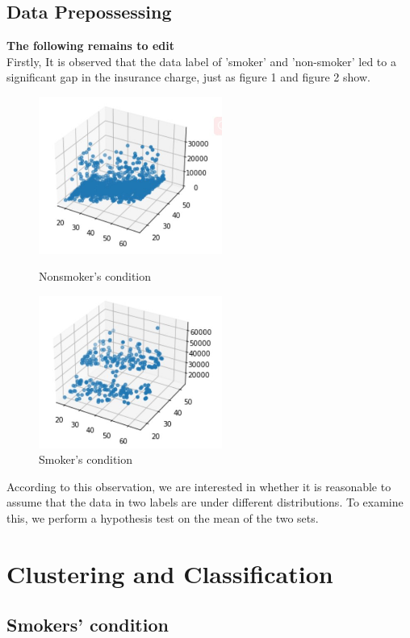 \documentclass[12pt,a4paper]{article}
\begin{document}
\subsection{Data Prepossessing}
\textbf{The following remains to edit} \\
Firstly, It is observed that the data label of 'smoker' and 'non-smoker' led to a significant gap in the insurance charge, just as figure 1 and figure 2 show. 

\begin{figure}[H]
\centering
\begin{minipage}[t]{0.48\textwidth}
\centering
\includegraphics[width=6cm]{nonsmokeroverall.jpg}
\caption{Nonsmoker's condition}
\end{minipage}
\begin{minipage}[t]{0.48\textwidth}
\centering
\includegraphics[width=6cm]{smokeroverall.jpg}
\caption{Smoker's condition}
\end{minipage}
\end{figure}

According to this observation, we are interested in whether it is reasonable to assume that the data in two labels are under different distributions. To examine this, we perform a hypothesis test on the mean of the two sets. 

\section{Clustering and Classification}
\subsection{Smokers' condition}
\end{document}
